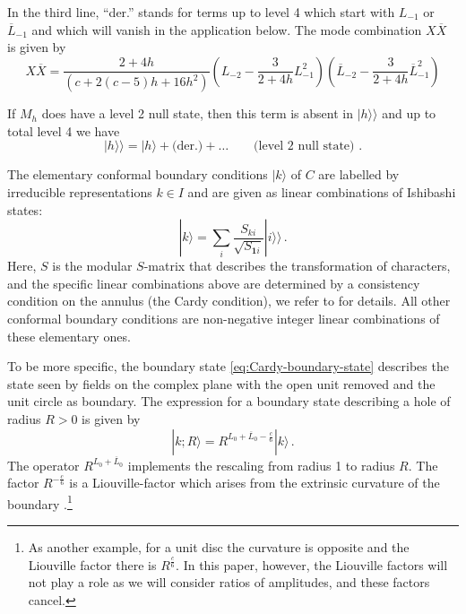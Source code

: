 \documentclass[11pt,a4paper]{article}
\numberwithin{equation}{section}
\def\ket#1{|{#1}\rangle}
\newcommand{\one}{\mathbf{1}} %
\begin{document}
\noindent 
In the third line, ``der.'' stands for terms up to level 4 which start with $L_{-1}$ or $\overline L_{-1}$ and which will vanish in the application below. The mode combination $X \overline X$ is given by
\begin{equation}
X \overline{X} = \frac{2+4h}{(c+2(c-5) h +16h^2)} \left(L_{-2} - \frac{3}{2+4h} L_{-1}^2\right)\left(\overline L_{-2} - \frac{3}{2+4h} \overline L_{-1}^2\right)
\end{equation}

\noindent
If $M_h$ does have a level 2 null state, then this term is absent in $\ket{h}\!\rangle$ and up to total level 4 we have
%
\begin{equation}\label{eq:primIshi-2null}
\ket{h}\!\rangle = \ket{h} + \text{(der.)} + \dots
\qquad \text{(level 2 null state) .}
\end{equation}


\noindent 
The elementary conformal boundary conditions $|k\rangle$ of $C$ are labelled by irreducible representations $k\in I$ and are given as linear combinations of Ishibashi states:
%
\begin{equation}\label{eq:Cardy-boundary-state}
\ket{k} = \sum_i  \frac{S_{ki}}{\sqrt{S_{\one i}}} \ket{i}\!\rangle\,.
\end{equation}
%
Here, $S$ is the modular $S$-matrix that describes the transformation of characters, and the specific linear combinations above are determined by a consistency condition on the annulus (the Cardy condition), we refer to \cite{Cardy:1989ir} for details. All other conformal boundary conditions are non-negative integer linear combinations of these elementary ones. 

To be more specific, the boundary state \eqref{eq:Cardy-boundary-state} describes the state seen by fields on the complex plane with the open unit removed and the unit circle as boundary. The expression for a boundary state describing a hole of radius $R>0$ is given by
%
\begin{equation}\label{eq:Cardy-boundary-state-anyR}
    \ket{k;R} 
= R^{L_0+\overline L_0 - \frac c6}  \ket{k} \,.
\end{equation}
The operator $R^{L_0+\overline L_0}$ implements the rescaling from radius 1 to radius $R$. The factor $R^{-\frac c6}$ is a Liouville-factor which arises from the extrinsic curvature of the boundary \cite{Cardy:1988tk}.\footnote{
	As another example, for a unit disc the curvature is opposite and the Liouville factor there is $R^{\frac c6}$. In this paper, however, the Liouville factors will not play a role as we will consider ratios of amplitudes, and these factors cancel.}
\end{document}

